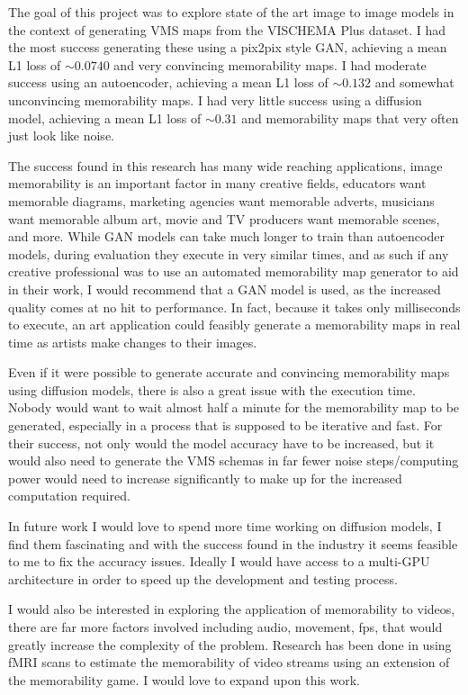 \documentclass{UoYCSproject}
\begin{document}
The goal of this project was to explore state of the art image to image models in the context of generating VMS maps from the VISCHEMA Plus dataset. I had the most success generating these using a pix2pix style GAN, achieving a mean L1 loss of \(\sim 0.0740 \) and very convincing memorability maps. I had moderate success using an autoencoder, achieving a mean L1 loss of \(\sim 0.132\) and somewhat unconvincing memorability maps. I had very little success using a diffusion model, achieving a mean L1 loss of \(\sim 0.31 \) and memorability maps that very often just look like noise.

The success found in this research has many wide reaching applications, image memorability is an important factor in many creative fields, educators want memorable diagrams, marketing agencies want memorable adverts, musicians want memorable album art, movie and TV producers want memorable scenes, and more. While GAN models can take much longer to train than autoencoder models, during evaluation they execute in very similar times, and as such if any creative professional was to use an automated memorability map generator to aid in their work, I would recommend that a GAN model is used, as the increased quality comes at no hit to performance. In fact, because it takes only milliseconds to execute, an art application could feasibly generate a memorability maps in real time as artists make changes to their images.

Even if it were possible to generate accurate and convincing memorability maps using diffusion models, there is also a great issue with the execution time. Nobody would want to wait almost half a minute for the memorability map to be generated, especially in a process that is supposed to be iterative and fast. For their success, not only would the model accuracy have to be increased, but it would also need to generate the VMS schemas in far fewer noise steps/computing power would need to increase significantly to make up for the increased computation required. 

In future work I would love to spend more time working on diffusion models, I find them fascinating and with the success found in the industry \cite{ramesh2022hierarchical, saharia2022photorealistic} it seems feasible to me to fix the accuracy issues. Ideally I would have access to a multi-GPU architecture in order to speed up the development and testing process.

I would also be interested in exploring the application of memorability to videos, there are far more factors involved including audio, movement, fps, that would greatly increase the complexity of the problem. Research has been done in \cite{HASSON2004, HASSONNeurocinematics, HASSON2008, fMRIPredictions} using fMRI scans to estimate the memorability of video streams using an extension of the memorability game. I would love to expand upon this work.
\end{document}

